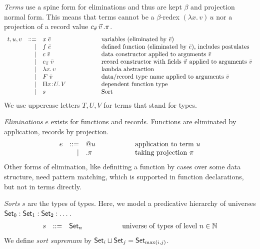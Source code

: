 \documentclass[acmlarge,fleqn]{acmart}\settopmatter{}
\renewcommand{\|}{\mid}
\begin{document}
\emph{Terms} use a spine form for eliminations and thus are kept $\beta$ and
projection normal form.  This means that terms cannot be a
$\beta$-redex $(\lambda x.\,v)\,u$ nor a projection of a record value
$c_{\vec\pi}\,\vec v\,.\pi$.
\[
\begin{array}{lrl@{\hspace{2cm}}l}
t, u, v
  &::=& x\; \bar{e}      & \text{variables (eliminated by $\bar{e}$)} \\
  & | & f\; \bar{e}      & \text{defined function (eliminated by $\bar{e}$), includes postulates} \\
  & | & c\; \bar{v}      & \text{data constructor applied to arguments $\bar{v}$} \\
  & | & \cpi\; \bar{v}   & \text{record constructor with fields $\vec\pi$ applied to arguments $\bar{v}$} \\
  & | & \lambda x.\, v   & \text{lambda abstraction} \\
  & | & F\; \bar{v}      & \text{data/record type name applied to arguments $\bar v$} \\
  & | & \funT x U V      & \text{dependent function type} \\
  & | & s                & \text{Sort} \\
\end{array}
\]
We use uppercase letters $T,U,V$ for terms that stand for types.

\emph{Eliminations} $e$ exists for functions and records.
Functions are eliminated by application, records by projection.
\[
\begin{array}{lrl@{\hspace{2cm}}l}
e &::=& @u               & \text{application to term $u$} \\
  & | & .\pi             & \text{taking projection $\pi$} \\
\end{array}
\]
Other forms of elimination, like definiting a function by cases over
some data structure, need pattern matching, which is supported in
function declarations, but not in terms directly.

\emph{Sorts} $s$ are the types of types.
Here, we model a predicative hierarchy of universes $\mathsf{Set}_0 : \mathsf{Set}_1 : \mathsf{Set}_2 : \dots$.
\[
\begin{array}{lrl@{\hspace{2cm}}l}
s & ::= & \Set_n         &  \text{universe of types of level $n \in \NN$} \\
\end{array}
\]
We define \emph{sort supremum}  by $\mathsf{Set}_i \sqcup \mathsf{Set}_j = \mathsf{Set}_{\max(i,j)}$.
\end{document}
